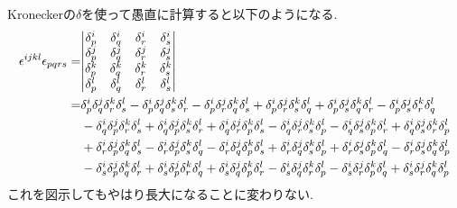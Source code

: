 \documentclass[dvipdfmx]{jsarticle}
\begin{document}
Kroneckerの$\delta$を使って愚直に計算すると以下のようになる.
\begin{align*}
    \epsilon^{ijkl}\epsilon_{pqrs}
    =&
    \mqty|
        \delta^i_p & \delta^i_q & \delta^i_r & \delta^i_s
        \\
        \delta^j_p & \delta^j_q & \delta^j_r & \delta^j_s
        \\
        \delta^k_p & \delta^k_q & \delta^k_r & \delta^k_s
        \\
        \delta^l_p & \delta^l_q & \delta^l_r & \delta^l_s
    |
    \\
    =&
    \delta^i_p\delta^j_q\delta^k_r\delta^l_s
    -
    \delta^i_p\delta^j_q\delta^k_s\delta^l_r
    -
    \delta^i_p\delta^j_r\delta^k_q\delta^l_s
    +
    \delta^i_p\delta^j_r\delta^k_s\delta^l_q
    +
    \delta^i_p\delta^j_s\delta^k_q\delta^l_r
    -
    \delta^i_p\delta^j_s\delta^k_r\delta^l_q
    \\
    &
    -
    \delta^i_q\delta^j_p\delta^k_r\delta^l_s
    +
    \delta^i_q\delta^j_p\delta^k_s\delta^l_r
    +
    \delta^i_q\delta^j_r\delta^k_p\delta^l_s
    -
    \delta^i_q\delta^j_r\delta^k_s\delta^l_p
    -
    \delta^i_q\delta^j_s\delta^k_p\delta^l_r
    +
    \delta^i_q\delta^j_s\delta^k_r\delta^l_p
    \\
    &
    +
    \delta^i_r\delta^j_p\delta^k_q\delta^l_s
    -
    \delta^i_r\delta^j_p\delta^k_s\delta^l_q
    -
    \delta^i_r\delta^j_q\delta^k_p\delta^l_s
    +
    \delta^i_r\delta^j_q\delta^k_s\delta^l_p
    +
    \delta^i_r\delta^j_s\delta^k_p\delta^l_q
    -
    \delta^i_r\delta^j_s\delta^k_q\delta^l_p
    \\
    &-
    \delta^i_s\delta^j_p\delta^k_q\delta^l_r
    +
    \delta^i_s\delta^j_p\delta^k_r\delta^l_q
    +
    \delta^i_s\delta^j_q\delta^k_p\delta^l_r
    -
    \delta^i_s\delta^j_q\delta^k_r\delta^l_p
    -
    \delta^i_s\delta^j_r\delta^k_p\delta^l_q
    +
    \delta^i_s\delta^j_r\delta^k_q\delta^l_p
\end{align*}
これを図示してもやはり長大になることに変わりない.
\begin{equation*}
    
\end{equation*}
\end{document}
